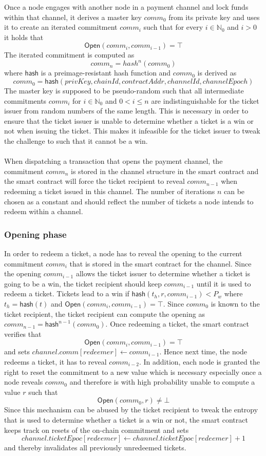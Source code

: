 Once a node engages with another node in a payment channel and lock funds within that channel, it derives a master key $comm_0$ from its private key and uses it to create an iterated commitment $comm_i$ such that for every $i \in \mathbb{N}_0$ and $i > 0$ it holds that $$ \mathsf{Open}(comm_{i}, comm_{i-1}) = \top $$
The iterated commitment is computed as $$comm_n = hash^n(comm_0)$$ where $\mathsf{hash}$ is a preimage-resistant hash function and $comm_0$ is derived as 
$$ comm_0 = \mathsf{hash}(privKey, chainId, contractAddr, channelId, channelEpoch)$$
The master key is supposed to be pseudo-random such that all intermediate commitments $comm_{i}$ for $i \in \mathbb{N}_0$ and $0 < i \le n$ are indistinguishable for the ticket issuer from random numbers of the same length. This is necessary in order to ensure that the ticket issuer is unable to determine whether a ticket is a win or not when issuing the ticket. This makes it infeasible for the ticket issuer to tweak the challenge to such that it cannot be a win.
\\~\\When dispatching a transaction that opens the payment channel, the commitment $comm_n$ is stored in the channel structure in the smart contract and the smart contract will force the ticket recipient to reveal $comm_{n-1}$ when redeeming a ticket issued in this channel.
The number of iterations $n$ can be chosen as a constant and should reflect the number of tickets a node intends to redeem within a channel.

\subsubsection{Opening phase}

In order to redeem a ticket, a node has to reveal the opening to the current commitment $comm_i$ that is stored in the smart contract for the channel. Since the opening $comm_{i-1}$ allows the ticket issuer to determine whether a ticket is going to be a win, the ticket recipient should keep $comm_{i-1}$ until it is used to redeem a ticket.
Tickets lead to a win if $\mathsf{hash}( t_h, r, comm_{i-1} ) < P_w$ where $t_h=\mathsf{hash}(t)$ and $\mathsf{Open}(comm_i, comm_{i-1}) = \top$. Since $comm_{0}$ is known to the ticket recipient, the ticket recipient can compute the opening as $comm_{n-1} = \mathsf{hash}^{n-1}(comm_0)$.
Once redeeming a ticket, the smart contract verifies that $$\mathsf{Open}(comm_i, comm_{i-1}) = \top$$ and sets $channel.comm[redeemer] \leftarrow comm_{i-1}$. Hence next time, the node redeems a ticket, it has to reveal $comm_{i-2}$.
In addition, each node is granted the right to reset the commitment to a new value which is necessary especially once a node reveals $comm_0$ and therefore is with high probability unable to compute a value $r$ such that $$\mathsf{Open}(comm_0,r) \neq \bot$$
Since this mechanism can be abused by the ticket recipient to tweak the entropy that is used to determine whether a ticket is a win or not, the smart contract keeps track on resets of the on-chain commitment and sets $$channel.ticketEpoc[redeemer] \leftarrow channel.ticketEpoc[redeemer] + 1$$ and thereby invalidates all previously unredeemed tickets.


